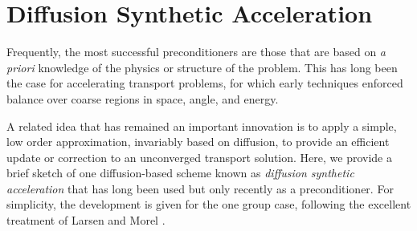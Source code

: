 
\section{Diffusion Synthetic Acceleration}

Frequently, the most successful preconditioners are those that are based 
on \emph{ a priori} knowledge of the physics or structure of the problem.
This has long been the case for accelerating transport problems, for 
which early techniques enforced balance over coarse regions in space, 
angle, and energy.  

A related idea that has remained an important 
innovation is to apply a simple, low order approximation, invariably
based on diffusion, to provide an efficient update or correction to 
an unconverged transport solution.  Here, we provide a brief sketch 
of one diffusion-based scheme known as \emph{ diffusion synthetic 
acceleration} that has long been used but only recently as a 
preconditioner.  For simplicity, the development is given for the 
one group case, following the excellent treatment 
of Larsen and Morel \cite{larsen2010ado}.

